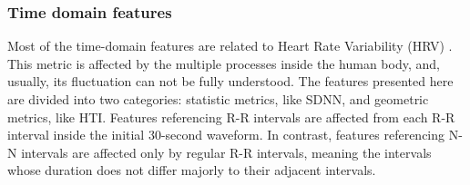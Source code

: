 \subsubsection{Time domain features}
\label{sssec:time_domain_features}
Most of the time-domain features are related to Heart Rate Variability (HRV) \cite{hrv_overview}. This metric is affected by the multiple processes inside the human body, and, usually, its fluctuation can not be fully understood. The features presented here are divided into two categories: statistic metrics, like SDNN, and geometric metrics, like HTI. Features referencing R-R intervals are affected from each R-R interval inside the initial 30-second waveform. In contrast, features referencing N-N intervals are affected only by regular R-R intervals, meaning the intervals whose duration does not differ majorly to their adjacent intervals.
%
